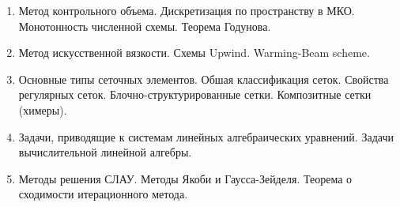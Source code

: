\documentclass[12pt,a4paper]{extarticle}
\begin{document}
\begin{enumerate}
		\item Метод контрольного объема. Дискретизация по пространству в МКО. Монотонность численной схемы. Теорема Годунова.

		\item Метод искусственной вязкости. Схемы Upwind. Warming-Beam scheme.

		\item Основные типы сеточных элементов. Обшая классификация сеток. Свойства регулярных сеток. Блочно-структурированные сетки. Композитные сетки (химеры).

		\item Задачи, приводящие к системам линейных алгебраических уравнений. Задачи вычислительной линейной алгебры.

		\item Методы решения СЛАУ. Методы Якоби и Гаусса-Зейделя. Теорема о сходимости итерационного метода.

    \end{enumerate}
\end{document}

